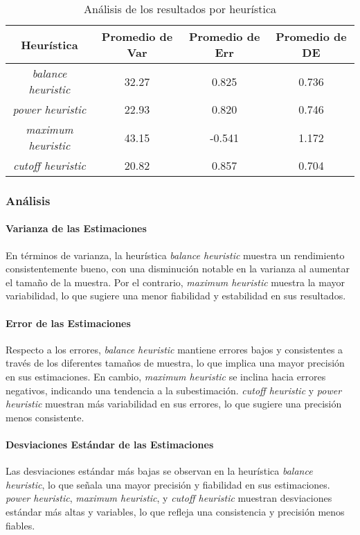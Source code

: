 \documentclass{article}
\begin{document}
\begin{table}[H]
\centering
\label{table:heuristic_analysis}
\begin{tabular}{|c|c|c|c|}
\hline
\textbf{Heurística} & \textbf{Promedio de Var} & \textbf{Promedio de Err} & \textbf{Promedio de DE} \\ \hline
\textit{balance heuristic} & 32.27 & 0.825 & 0.736 \\ \hline
\textit{power heuristic} & 22.93 & 0.820 & 0.746 \\ \hline
\textit{maximum heuristic} & 43.15 & -0.541 & 1.172 \\ \hline
\textit{cutoff heuristic} & 20.82 & 0.857 & 0.704 \\ \hline
\end{tabular}
\caption{Análisis de los resultados por heurística}
\end{table}


\subsubsection{Análisis}

\paragraph{Varianza de las Estimaciones}
En términos de varianza, la heurística \textit{balance heuristic} muestra un rendimiento consistentemente bueno, con una disminución notable en la varianza al aumentar el tamaño de la muestra. Por el contrario, \textit{maximum heuristic} muestra la mayor variabilidad, lo que sugiere una menor fiabilidad y estabilidad en sus resultados.

\paragraph{Error de las Estimaciones}
Respecto a los errores, \textit{balance heuristic} mantiene errores bajos y consistentes a través de los diferentes tamaños de muestra, lo que implica una mayor precisión en sus estimaciones. En cambio, \textit{maximum heuristic} se inclina hacia errores negativos, indicando una tendencia a la subestimación. \textit{cutoff heuristic} y \textit{power heuristic} muestran más variabilidad en sus errores, lo que sugiere una precisión menos consistente.

\paragraph{Desviaciones Estándar de las Estimaciones}
Las desviaciones estándar más bajas se observan en la heurística \textit{balance heuristic}, lo que señala una mayor precisión y fiabilidad en sus estimaciones. \textit{power heuristic}, \textit{maximum heuristic}, y \textit{cutoff heuristic} muestran desviaciones estándar más altas y variables, lo que refleja una consistencia y precisión menos fiables.
\end{document}
